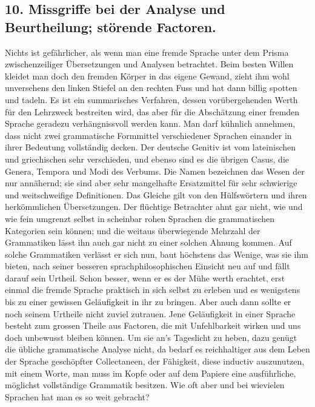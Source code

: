   
\clearpage
{}
\subsection*{10. Missgriffe bei der Analyse und Beurtheilung; störende Factoren.}\label{IV.IV.10}

Nichts ist gefährlicher, als wenn man eine fremde Sprache unter dem Prisma zwischenzeiliger Übersetzungen und Analysen betrachtet. Beim besten Willen kleidet man doch den fremden Körper in das eigene Gewand, zieht ihm wohl unversehens den linken Stiefel an den rechten Fuss und hat dann billig spotten und tadeln. Es ist ein summarisches Verfahren, dessen vorübergehenden Werth für den Lehrzweck  bestreiten wird, das aber für die Abschätzung einer fremden Sprache geradezu verhängnissvoll werden kann. Man darf kühnlich annehmen, dass nicht zwei grammatische Formmittel verschiedener Sprachen einander in \label{fp.386} ihrer Bedeutung vollständig decken. Der deutsche Genitiv ist vom lateinischen und griechischen sehr verschieden, und ebenso sind es die übrigen Casus, die Genera, Tempora und Modi des Verbums. Die Namen bezeichnen das Wesen der  nur annähernd; sie sind  aber sehr mangelhafte Ersatzmittel für sehr schwierige und weitschweifige Definitionen. Das Gleiche gilt von den Hülfswörtern und ihren herkömmlichen Übersetzungen. Der flüchtige Betrachter ahnt gar nicht, wie  und wie fein umgrenzt selbst in scheinbar rohen Sprachen die grammatischen Kategorien sein können; und die weitaus überwiegende Mehrzahl der Grammatiken lässt ihn auch gar nicht zu einer solchen Ahnung kommen. Auf solche Grammatiken verlässt er sich nun, baut höchstens das Wenige, was sie ihm bieten, nach seiner besseren sprachphilosophischen Einsicht neu auf und fällt darauf sein Urtheil. Schon besser, wenn er es der Mühe werth erachtet, erst einmal die fremde Sprache praktisch in sich selbst zu erleben und es wenigstens bis zu einer gewissen Geläufigkeit in ihr zu bringen. Aber auch dann sollte er noch seinem Urtheile nicht zuviel zutrauen. Jene Geläufigkeit in einer Sprache besteht zum grossen Theile aus Factoren, die mit Unfehlbarkeit wirken und uns doch unbewusst bleiben können. Um sie an’s \label{sp.406} Tageslicht zu heben, dazu genügt die übliche grammatische Analyse nicht, da bedarf es reichhaltiger aus dem Leben der Sprache geschöpfter Collectaneen, der Fähigkeit, diese inductiv auszunutzen, mit einem Worte, man muss im Kopfe oder auf dem Papiere eine ausführliche, möglichst vollständige Grammatik besitzen. Wie oft aber und bei wievielen Sprachen hat man es so weit gebracht?


